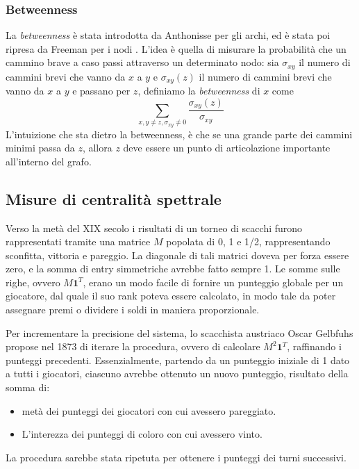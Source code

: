 \subsubsection{Betweenness}
La \textit{betweenness} è stata introdotta da Anthonisse \cite{ant} per gli archi, ed è stata poi ripresa da Freeman per i nodi \cite{morgan}. L'idea è quella di misurare la probabilità che un cammino brave a caso passi attraverso un determinato nodo: sia $\sigma_{xy}$ il numero di cammini brevi che vanno da $x$ a $y$ e $\sigma_{xy}(z)$ il numero di cammini brevi che vanno da $x$ a $y$ e passano per $z$, definiamo la \textit{betweenness} di $x$ come
\begin{equation*}
    \sum_{x, y \neq z, \sigma_{xy} \neq 0}{\frac{\sigma_{xy}(z)}{\sigma_{xy}}}
\end{equation*}
L'intuizione che sta dietro la betweenness, è che se una grande parte dei cammini minimi passa da $z$, allora $z$ deve essere un punto di articolazione importante all'interno del grafo.
\subsection{Misure di centralità spettrale}
Verso la metà del XIX secolo i risultati di un torneo di scacchi furono rappresentati tramite una matrice $M$ popolata di 0, 1 e 1/2, rappresentando sconfitta, vittoria e pareggio. La diagonale di tali matrici doveva per forza essere zero, e la somma di entry simmetriche avrebbe fatto sempre 1. Le somme sulle righe, ovvero $M\textbf{1}^T$, erano un modo facile di fornire un punteggio globale per un giocatore, dal quale il suo rank poteva essere calcolato, in modo tale da poter assegnare premi o dividere i soldi in maniera proporzionale.

Per incrementare la precisione del sistema, lo scacchista austriaco Oscar Gelbfuhs propose nel 1873 di iterare la procedura, ovvero di calcolare $M^2\textbf{1}^T$, raffinando i punteggi precedenti. Essenzialmente, partendo da un punteggio iniziale di 1 dato a tutti i giocatori, ciascuno avrebbe ottenuto un nuovo punteggio, risultato della somma di:
\begin{itemize}
    \item metà dei punteggi dei giocatori con cui avessero pareggiato.
    \item L'interezza dei punteggi di coloro con cui avessero vinto.
\end{itemize}
La procedura sarebbe stata ripetuta per ottenere i punteggi dei turni successivi.

